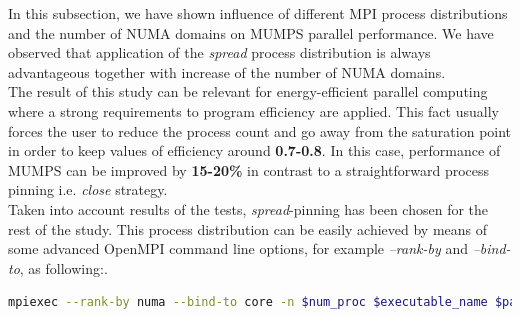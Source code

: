 In this subsection, we have shown influence of different MPI process distributions and the number of NUMA domains on MUMPS parallel performance. We have observed that application of the \textit{spread} process distribution is always advantageous together with increase of the number of NUMA domains.\\ 


The result of this study can be relevant for energy-efficient parallel computing where a strong requirements to program efficiency are applied. This fact usually forces the user to reduce the process count and go away from the saturation point in order to keep values of efficiency around \textbf{0.7-0.8}. In this case, performance of MUMPS can be improved by \textbf{15-20\%} in contrast to a straightforward process pinning i.e. \textit{close} strategy.\\


Taken into account results of the tests, \textit{spread}-pinning has been chosen for the rest of the study. This process distribution can be easily achieved by means of some advanced OpenMPI command line options, for example \textit{--rank-by} and \textit{--bind-to}, as following:. \\

\begin{lstlisting}[language=bash, mathescape=false, caption={An example of \textit{spread}-pinning with using  advanced OpenMPI command line options}, frame=single, label={lst:iterative-refinement}]
mpiexec --rank-by numa --bind-to core -n $num_proc $executable_name $parameters
\end{lstlisting}
